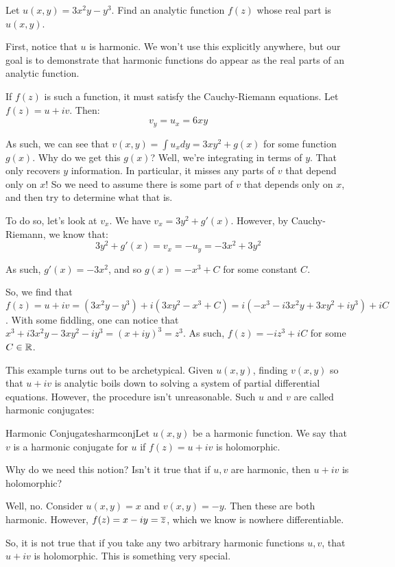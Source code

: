 \begin{ex}{}{} Let $u(x,y) = 3x^2y - y^3$. Find an analytic function $f(z)$ whose real part is $u(x,y)$.

First, notice that $u$ is harmonic. We won't use this explicitly anywhere, but our goal is to demonstrate that harmonic functions do appear as the real parts of an analytic function. 

If $f(z)$ is such a function, it must satisfy the Cauchy-Riemann equations. Let $f(z) = u + iv$. Then:
$$v_y = u_x = 6xy$$

As such, we can see that $v(x,y) = \int u_xdy = 3xy^2 + g(x)$ for some function $g(x)$. Why do we get this $g(x)$? Well, we're integrating in terms of $y$. That only recovers $y$ information. In particular, it misses any parts of $v$ that depend only on $x$! So we need to assume there is some part of $v$ that depends only on $x$, and then try to determine what that is.

To do so, let's look at $v_x$. We have $v_x = 3y^2 + g'(x)$. However, by Cauchy-Riemann, we know that:
$$3y^2 + g'(x) = v_x = -u_y = -3x^2 + 3y^2$$

As such, $g'(x) = -3x^2$, and so $g(x) = -x^3 + C$ for some constant $C$.

So, we find that $f(z) = u + iv = (3x^2y - y^3) + i(3xy^2 - x^3 + C) = i(-x^3 -i3x^2y + 3xy^2 +iy^3) + iC$. With some fiddling, one can notice that $x^3 + i3x^2y - 3xy^2 -iy^3 = (x+iy)^3 = z^3$. As such, $f(z) = -iz^3 + iC$ for some $C\in \mathbb{R}$.

\end{ex}

This example turns out to be archetypical. Given $u(x,y)$, finding $v(x,y)$ so that $u+iv$ is analytic boils down to solving a system of partial differential equations. However, the procedure isn't unreasonable. Such $u$ and $v$ are called harmonic conjugates:

\begin{defbo}{Harmonic Conjugates}{harmconj}Let $u(x,y)$ be a harmonic function. We say that $v$ is a harmonic conjugate for $u$ if $f(z) = u + iv$ is holomorphic.
\end{defbo}

\begin{ex}{}{} Why do we need this notion? Isn't it true that if $u,v$ are harmonic, then $u+iv$ is holomorphic?

Well, no. Consider $u(x,y) = x$ and $v(x,y) = -y$. Then these are both harmonic. However, $f(z) = x-iy = \overline{z}$, which we know is nowhere differentiable.

So, it is not true that if you take any two arbitrary harmonic functions $u,v$, that $u+iv$ is holomorphic. This is something very special.
\end{ex}

